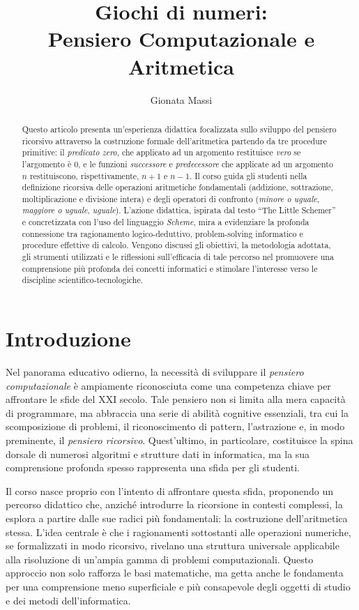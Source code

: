 \documentclass[withtimes]{easychair}
\title{Giochi di numeri:\\Pensiero Computazionale e Aritmetica}
\author{
Gionata Massi%
}
\institute{
   Istituto di Istruzione Superiore Savoia Benincasa\\
   Ancona, Italia\\
   \email{gionata.massi@savoiabenincasa.it}
}
\begin{document}
\maketitle


\begin{abstract}
  Questo articolo presenta un'esperienza didattica focalizzata sullo sviluppo del pensiero ricorsivo attraverso la costruzione formale dell'aritmetica partendo da tre procedure primitive: il \emph{predicato zero}, che applicato ad un argomento restituisce \emph{vero} se l'argomento è 0, e le funzioni \emph{successore} e \emph{predecessore} che applicate ad un argomento $n$ restituiscono, rispettivamente, $n+1$ e $n-1$. Il corso guida gli studenti nella definizione ricorsiva delle operazioni aritmetiche fondamentali (addizione, sottrazione, moltiplicazione e divisione intera) e degli operatori di confronto (\emph{minore o uguale}, \emph{maggiore o uguale}, \emph{uguale}\textellipsis). L'azione didattica, ispirata dal testo ``The Little Schemer'' e concretizzata con l'uso del linguaggio \emph{Scheme}, mira a evidenziare la profonda connessione tra ragionamento logico-deduttivo, problem-solving informatico e procedure effettive di calcolo. Vengono discussi gli obiettivi, la metodologia adottata, gli strumenti utilizzati e le riflessioni sull'efficacia di tale percorso nel promuovere una comprensione più profonda dei concetti informatici e stimolare l'interesse verso le discipline scientifico-tecnologiche.
\end{abstract}

\section{Introduzione}\label{introduzione}

Nel panorama educativo odierno, la necessità di sviluppare il \emph{pensiero computazionale} è ampiamente riconosciuta come una competenza chiave per affrontare le sfide del XXI secolo. Tale pensiero non si limita alla mera capacità di programmare, ma abbraccia una serie di abilità cognitive essenziali, tra cui la scomposizione di problemi, il riconoscimento di pattern, l'astrazione e, in modo preminente, il \emph{pensiero ricorsivo}. Quest'ultimo, in particolare, costituisce la spina dorsale di numerosi algoritmi e strutture dati in informatica, ma la sua comprensione profonda spesso rappresenta una sfida per gli studenti.

Il corso nasce proprio con l'intento di affrontare questa sfida, proponendo un percorso didattico che, anziché introdurre la ricorsione in contesti complessi, la esplora a partire dalle sue radici più fondamentali: la costruzione dell'aritmetica stessa. L'idea centrale è che i ragionamenti sottostanti alle operazioni numeriche, se formalizzati in modo ricorsivo, rivelano una struttura universale applicabile alla risoluzione di un'ampia gamma di problemi computazionali. Questo approccio non solo rafforza le basi matematiche, ma getta anche le fondamenta per una comprensione meno superficiale e più consapevole degli oggetti di studio e dei metodi dell'informatica.
\end{document}
